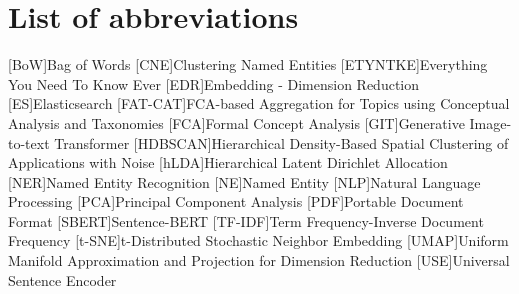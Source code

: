 \section*{List of abbreviations}

\begin{acronym}[XXXXXXXXX]
    [BoW]{Bag of Words}
    [CNE]{Clustering Named Entities}
    [ETYNTKE]{Everything You Need To Know Ever}
    [EDR]{Embedding - Dimension Reduction}
    [ES]{Elasticsearch}
    [FAT-CAT]{FCA-based Aggregation for Topics using Conceptual Analysis and Taxonomies}
    [FCA]{Formal Concept Analysis}
    [GIT]{Generative Image-to-text Transformer}
    [HDBSCAN]{Hierarchical Density-Based Spatial Clustering of Applications with Noise}
    [hLDA]{Hierarchical Latent Dirichlet Allocation}    [NER]{Named Entity Recognition}
    [NE]{Named Entity}
    [NLP]{Natural Language Processing}
    [PCA]{Principal Component Analysis}
    [PDF]{Portable Document Format}
    [SBERT]{Sentence-BERT}
    [TF-IDF]{Term Frequency-Inverse Document Frequency}
    [t-SNE]{t-Distributed Stochastic Neighbor Embedding}
    [UMAP]{Uniform Manifold Approximation and Projection for Dimension Reduction}
    [USE]{Universal Sentence Encoder}
\end{acronym}